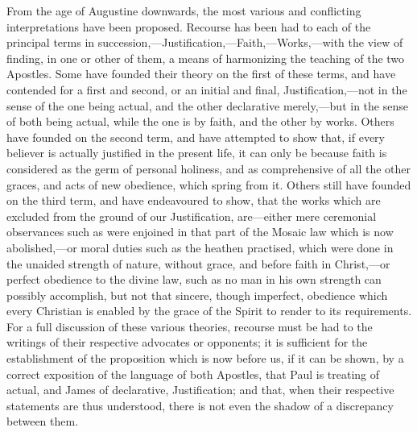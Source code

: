 \documentclass[
]{book}
\begin{document}
From the age of Augustine downwards, the most various and conflicting interpretations have been proposed. Recourse has been had to each of the principal terms in succession,---Justification,---Faith,---Works,---with the view of finding, in one or other of them, a means of harmonizing the teaching of the two Apostles. Some have founded their theory on the first of these terms, and have contended for a first and second, or an initial and final, Justification,---not in the sense of the one being actual, and the other declarative merely,---but in the sense of both being actual, while the one is by faith, and the other by works. Others have founded on the second term, and have attempted to show that, if every believer is actually justified in the present life, it can only be because faith is considered as the germ of personal holiness, and as comprehensive of all the other graces, and acts of new obedience, which spring from it. Others still have founded on the third term, and have endeavoured to show, that the works which are excluded from the ground of our Justification, are---either mere ceremonial observances such as were enjoined in that part of the Mosaic law which is now abolished,---or moral duties such as the heathen practised, which were done in the unaided strength of nature, without grace, and before faith in Christ,---or perfect obedience to the divine law, such as no man in his own strength can possibly accomplish, but not that sincere, though imperfect, obedience which every Christian is enabled by the grace of the Spirit to render to its requirements. For a full discussion of these various theories, recourse must be had to the writings of their respective advocates or opponents; it is sufficient for the establishment of the proposition which is now before us, if it can be shown, by a correct exposition of the language of both Apostles, that Paul is treating of actual, and James of declarative, Justification; and that, when their respective statements are thus understood, there is not even the shadow of a discrepancy between them.
\end{document}
